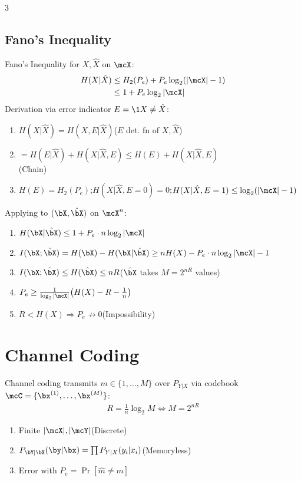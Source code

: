 \documentclass[12pt, a4paper]{article}
\begin{document}
\begin{multicols*}{3}
\subsection{Fano's Inequality}
Fano's Inequality for $X,\hat X$ on $\mcX$:
\begin{align*}
  H(X|\hat X)&\le H_2(P_e)+P_e\log_2(|\mcX|-1)\\
             &\le 1+P_e\log_2|\mcX|
\end{align*}
Derivation via error indicator $E=\1{X\neq\hat X}$:
\begin{enumerate}[\roman*.]
  \item $H(X|\hat X)=H(X,E|\hat X)$\hfill($E$ det. fn of $X,\hat X$)
  \item $=H(E|\hat X)+H(X|\hat X,E)\le H(E)+H(X|\hat X,E)$\\\hfill(Chain)
  \item $H(E)=H_2(P_e)$;\;$H(X|\hat X,E=0)=0$;\;$H(X|\hat X,E=1)\le\log_2(|\mcX|-1)$
\end{enumerate}
 
Applying to $(\bX,\hat\bX)$ on $\mcX^n$:
\begin{enumerate}[\roman*.]
  \item $H(\bX|\hat\bX)\le 1+P_e\cdot n\log_2|\mcX|$
  \item $I(\bX;\hat\bX)=H(\bX)-H(\bX|\hat\bX)\ge nH(X)-P_e\cdot n\log_2|\mcX|-1$
  \item $I(\bX;\hat\bX)\le H(\hat\bX)\le nR$\hfill($\hat\bX$ takes $M=2^{nR}$ values)
  \item $P_e\ge\tfrac{1}{\log_2|\mcX|}\big(H(X)-R-\tfrac{1}{n}\big)$
  \item $R<H(X)\Rightarrow P_e\not\to 0$\hfill(Impossibility)
\end{enumerate}
\colbreak 
\colbreak
\section{Channel Coding}
Channel coding transmits $m\in\{1,\dots,M\}$ over $P_{Y|X}$ via codebook $\mcC=\{\bx^{(1)},\dots,\bx^{(M)}\}$:
\begin{align*}
  R=\tfrac{1}{n}\log_2 M \iff M = 2^{nR}
\end{align*}
\begin{enumerate}[\roman*.]
  \item Finite $|\mcX|,|\mcY|$\hfill(Discrete)
  \item $P_{\bY|\bX}(\by|\bx)=\prod P_{Y|X}(y_i|x_i)$\hfill(Memoryless)
  \item Error with $P_e=\Pr[\hat m\neq m]$
\end{enumerate}
 

\end{multicols*}
\end{document}
